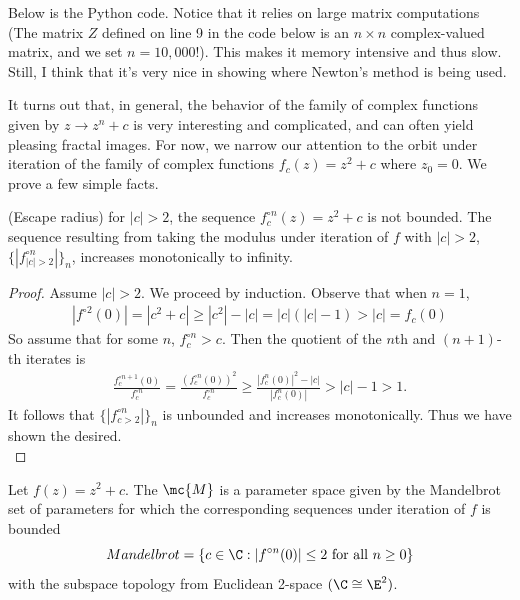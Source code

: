 \documentclass[x11names,reqno,14pt]{extarticle}
\begin{document}
Below is the Python code. Notice that it relies on large matrix computations (The matrix $Z$ defined on line 9 in the code below is an $n \times n$ complex-valued matrix, and we set $n = 10,000$!). This makes it memory intensive and thus slow. Still, I think that it's very nice in showing where Newton's method is being used.
\begin{mdframed}[
	backgroundcolor=Background,
	hidealllines=true,
	innertopmargin=0pt,
	innerbottommargin=0pt,
	innerleftmargin=0pt,
	innerrightmargin=0pt
	]
	
\end{mdframed}

It turns out that, in general, the behavior of the family of complex functions given by $z \to z^n + c$ is very interesting and complicated, and can often yield pleasing fractal images. For now, we narrow our attention to the orbit under iteration of the family of complex functions $f_c(z) = z^2 + c$ where $z_0 = 0$. We prove a few simple facts.
\begin{prop}
	(Escape radius) for $|c| > 2$, the sequence $f^{\circ n}_c(z) = z^2 + c$ is not bounded. The sequence resulting from taking the modulus under iteration of $f$ with $|c| > 2$, $\{|f^{\circ n}_{|c| > 2}|\}_n$, increases monotonically to infinity.
\end{prop}
\begin{proof}
	Assume $|c| > 2$. We proceed by induction. Observe that when $n = 1$,
	\begin{align}
		|f^{\circ 2}(0)| = |c^2 + c| \geq |c^2| - |c| = |c|(|c| - 1) > |c| = f_c(0)
	\end{align}
	So assume that for some $n$, $f_c^{\circ n} > c$. Then the quotient of the $n$th and $(n+1)$-th iterates is
	\begin{align}
		\frac{f_c^{\circ n + 1} (0)}{f_c^{\circ n}} = \frac{(f_c^{\circ n} (0))^2}{f_c^{\circ n}} \geq \frac{|f^n_c(0)|^2 - |c|}{|f_c^n(0)|} > |c| - 1 > 1.
	\end{align}
	It follows that $\{|f^{\circ n}_{c > 2}|\}_n$ is unbounded and increases monotonically. Thus we have shown the desired.\qedhere\\
\end{proof}
\begin{defn}
	Let $f(z) = z^2 + c$. The  $\mc{M}$ is a parameter space given by the Mandelbrot set of parameters for which the corresponding sequences under iteration of $f$ is bounded \[Mandelbrot = \{c \in \C : |f^{\circ n}(0)| \leq 2 \text{ for all }n \geq 0\}\]
	with the subspace topology from Euclidean 2-space $(\C \cong \E^2)$.
\end{defn}
\end{document}
